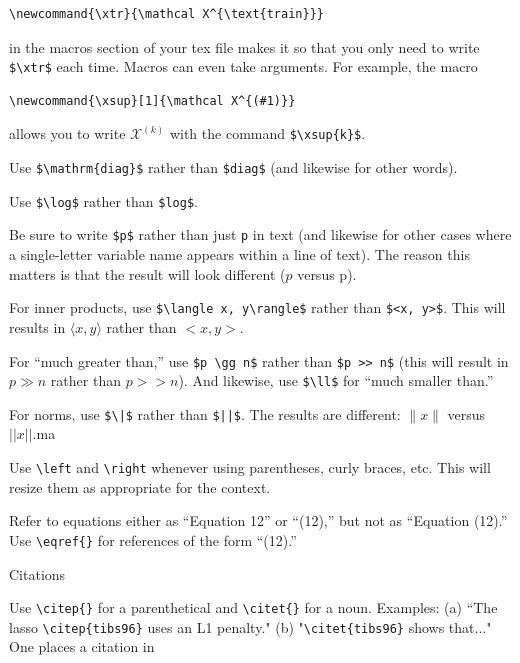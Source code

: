 \documentclass[11pt]{article}
\begin{document}
\begin{todolist}
\begin{todolist}
\begin{verbatim}
\newcommand{\xtr}{\mathcal X^{\text{train}}}
\end{verbatim}
in the macros section of your tex file makes it so that you only need to write
\verb+$\xtr$+ each time.  Macros can even take arguments.  For example,
the macro

\begin{verbatim}
\newcommand{\xsup}[1]{\mathcal X^{(#1)}}
\end{verbatim}

allows you to write $\mathcal X^{(k)}$ with the command \verb+$\xsup{k}$+.


  
\item Use \verb+$\mathrm{diag}$+ rather than \verb+$diag$+ (and
  likewise for other words).
  \item Use \verb+$\log$+ rather than \verb+$log$+.
\item Be sure to write \verb+$p$+ rather than just \verb+p+ in text (and likewise
  for other cases where a single-letter variable name appears within a
  line of text).  The reason this matters is that the result will look
  different ($p$ versus p).
\item For inner products, use \verb+$\langle x, y\rangle$+ rather than
  \verb+$<x, y>$+. This will results in $\langle x, y\rangle$ rather
  than $<x, y>$.
\item For ``much greater than,'' use \verb+$p \gg n$+ rather than
  \verb+$p >> n$+ (this will result in $p \gg n$ rather than $p >>
  n$).  And likewise, use \verb+$\ll$+ for “much smaller than.”
\item For norms, use \verb+$\|$+ rather than \verb+$||$+.  The results
  are different: $\|x\|$ versus $||x||$.ma
  \item Use \verb+\left+ and \verb+\right+ whenever using parentheses,
    curly braces, etc.  This will resize them as appropriate for the context.
    \item Refer to equations either as ``Equation 12'' or ``(12),'' but
      not as ``Equation (12).''  Use \verb+\eqref{}+ for references of
      the form ``(12).''
  \end{todolist}
\item Citations
  \begin{todolist}
\item Use \verb+\citep{}+ for a parenthetical and \verb+\citet{}+ for a noun.
    Examples: (a) ``The lasso \verb+\citep{tibs96}+ uses an L1 penalty." (b)
    "\verb+\citet{tibs96}+ shows that..."  One places a citation in

\end{todolist}
\end{todolist}
\end{document}
